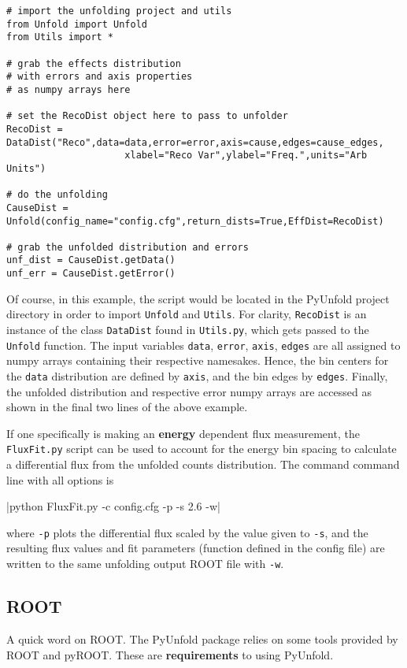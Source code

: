 \begin{verbatim}
# import the unfolding project and utils
from Unfold import Unfold
from Utils import *

# grab the effects distribution 
# with errors and axis properties 
# as numpy arrays here

# set the RecoDist object here to pass to unfolder
RecoDist = DataDist("Reco",data=data,error=error,axis=cause,edges=cause_edges,
                     xlabel="Reco Var",ylabel="Freq.",units="Arb Units")

# do the unfolding
CauseDist = Unfold(config_name="config.cfg",return_dists=True,EffDist=RecoDist)

# grab the unfolded distribution and errors
unf_dist = CauseDist.getData()
unf_err = CauseDist.getError()

\end{verbatim}
Of course, in this example, the script would be located in the PyUnfold project directory in order to import \verb|Unfold| and \verb|Utils|.
For clarity, \verb|RecoDist| is an instance of the class \verb|DataDist| found in \verb|Utils.py|, which gets passed to the \verb|Unfold| function. 
The input variables \verb|data|, \verb|error|, \verb|axis|, \verb|edges| are all assigned to numpy arrays containing their respective namesakes. 
Hence, the bin centers for the \verb|data| distribution are defined by \verb|axis|, and the bin edges by \verb|edges|. 
Finally, the unfolded distribution and respective error numpy arrays are accessed as shown in the final two lines of the above example.

If one specifically is making an {\bf energy} dependent flux measurement, the \verb|FluxFit.py| script can be used to account for 
the energy bin spacing to calculate a differential flux from the unfolded counts distribution. The command command line with all options is

|python FluxFit.py -c config.cfg -p -s 2.6 -w|

where \verb|-p| plots the differential flux scaled by the value given to \verb|-s|, and the resulting flux values and fit parameters (function defined in the config file)
are written to the same unfolding output ROOT file with \verb|-w|.


\subsection{ROOT}
A quick word on ROOT. The PyUnfold package relies on some tools provided by ROOT and pyROOT.
These are {\bf requirements} to using PyUnfold.

